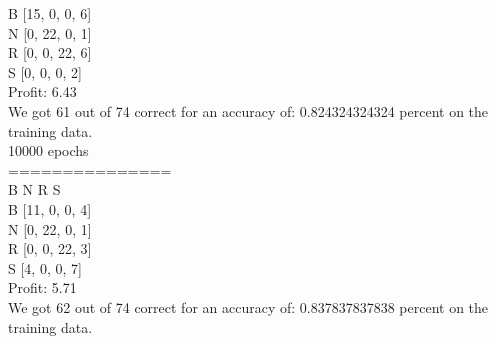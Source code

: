\documentclass{book}
\begin{document}
B [15, 0, 0, 6]
\\
N [0, 22, 0, 1]
\\
R [0, 0, 22, 6]
\\
S [0, 0, 0, 2]
\\
Profit: 6.43
\\
We got 61 out of 74 correct for an accuracy of: 0.824324324324 percent on the training data.
\\
10000 epochs
\\
===============
\\
   B  N  R  S
\\
B [11, 0, 0, 4]
\\
N [0, 22, 0, 1]
\\
R [0, 0, 22, 3]
\\
S [4, 0, 0, 7]
\\
Profit: 5.71
\\
We got 62 out of 74 correct for an accuracy of: 0.837837837838 percent on the training data.\\
\end{document}
